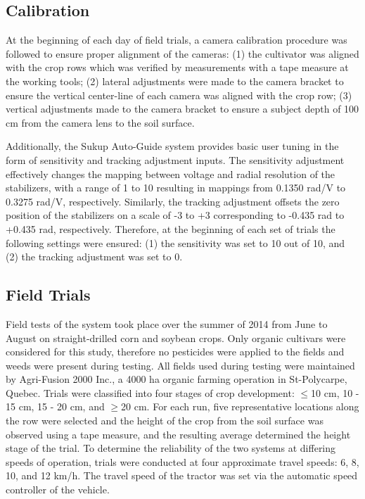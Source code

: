 \documentclass[authoryear]{elsarticle}
\begin{document}
\subsection{Calibration}
At the beginning of each day of field trials, a camera calibration
procedure was followed to ensure proper alignment of the cameras: (1)
the cultivator was aligned with the crop rows which was verified by
measurements with a tape measure at the working tools; (2) lateral
adjustments were made to the camera bracket to ensure the vertical
center-line of each camera was aligned with the crop row; (3) vertical
adjustments made to the camera bracket to ensure a subject depth of
100 cm from the camera lens to the soil surface.

Additionally, the Sukup Auto-Guide system provides basic user tuning
in the form of sensitivity and tracking adjustment inputs. The
sensitivity adjustment effectively changes the mapping between voltage
and radial resolution of the stabilizers, with a range of 1 to 10
resulting in mappings from 0.1350 rad/V to 0.3275 rad/V,
respectively. Similarly, the tracking adjustment offsets the zero
position of the stabilizers on a scale of -3 to +3 corresponding to
-0.435 rad to +0.435 rad, respectively. Therefore, at the beginning of
each set of trials the following settings were ensured: (1) the
sensitivity was set to 10 out of 10, and (2) the tracking adjustment
was set to 0.

\subsection{Field Trials}
Field tests of the system took place over the summer of 2014 from June
to August on straight-drilled corn and soybean crops. Only organic
cultivars were considered for this study, therefore no pesticides were
applied to the fields and weeds were present during testing. All
fields used during testing were maintained by Agri-Fusion 2000 Inc., a
4000 ha organic farming operation in St-Polycarpe, Quebec. Trials were
classified into four stages of crop development: $\le$10 cm, 10 - 15
cm, 15 - 20 cm, and $\ge$20 cm. For each run, five representative
locations along the row were selected and the height of the crop from
the soil surface was observed using a tape measure, and the resulting
average determined the height stage of the trial. To determine the
reliability of the two systems at differing speeds of operation,
trials were conducted at four approximate travel speeds: 6, 8, 10, and
12 km/h. The travel speed of the tractor was set via the automatic
speed controller of the vehicle.
\end{document}
